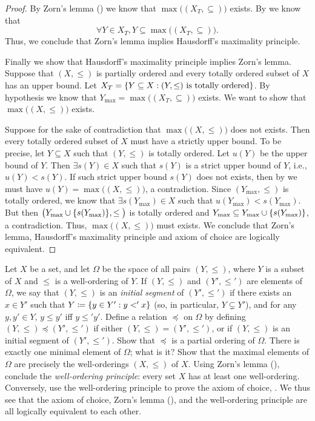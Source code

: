 \begin{proof}
  By Zorn's lemma () we know that \(\max\big((X_T, \subseteq)\big)\) exists.
  By  we know that
  \[
    \forall Y \in X_T, Y \subseteq \max\big((X_T, \subseteq)\big).
  \]
  Thus, we conclude that Zorn's lemma implies Hausdorff's maximality principle.

  Finally we show that Hausdorff's maximality principle implies Zorn's lemma.
  Suppose that \((X, \leq)\) is partially ordered and every totally ordered subset of \(X\) has an upper bound.
  Let \(X_T = \left\lbrace Y \subseteq X : (Y, \leq) \text{ is totally ordered}\right\rbrace\).
  By hypothesis we know that \(Y_{\max} = \max\big((X_T, \subseteq)\big)\) exists.
  We want to show that \(\max\big((X, \leq)\big)\) exists.

  Suppose for the sake of contradiction that \(\max\big((X, \leq)\big)\) does not exists.
  Then every totally ordered subset of \(X\) must have a strictly upper bound.
  To be precise, let \(Y \subseteq X\) such that \((Y, \leq)\) is totally ordered.
  Let \(u(Y)\) be the upper bound of \(Y\).
  Then \(\exists s(Y) \in X\) such that \(s(Y)\) is a strict upper bound of \(Y\), i.e., \(u(Y) < s(Y)\).
  If such strict upper bound \(s(Y)\) does not exists, then by  we must have \(u(Y) = \max\big((X, \leq)\big)\), a contradiction.
  Since \((Y_{\max}, \leq)\) is totally ordered, we know that \(\exists s(Y_{\max}) \in X\) such that \(u(Y_{\max}) < s(Y_{\max})\).
  But then \(\big(Y_{\max} \cup \set{s(Y_{\max})}, \leq\big)\) is totally ordered and \(Y_{\max} \subseteq Y_{\max} \cup \left\lbrace s(Y_{\max})\right\rbrace\), a contradiction.
  Thus, \(\max\big((X, \leq)\big)\) must exists.
  We conclude that Zorn's lemma, Hausdorff's maximality principle and axiom of choice are logically equivalent.
\end{proof}

\begin{ex}\label{i:ex:8.5.19}
  Let \(X\) be a set, and let \(\Omega\) be the space of all pairs \((Y, \leq)\), where \(Y\) is a subset of \(X\) and \(\leq\) is a well-ordering of \(Y\).
  If \((Y, \leq)\) and \((Y', \leq')\) are elements of \(\Omega\), we say that \((Y, \leq)\) is an \emph{initial segment} of \((Y', \leq')\) if there exists an \(x \in Y'\) such that \(Y \coloneqq \left\lbrace y \in Y' : y <' x\right\rbrace\) (so, in particular, \(Y \subsetneq Y'\)), and for any \(y, y' \in Y\), \(y \leq y'\) iff \(y \leq' y'\).
  Define a relation \(\preceq\) on \(\Omega\) by defining \((Y, \leq) \preceq (Y', \leq')\) if either \((Y, \leq) = (Y', \leq')\), or if \((Y, \leq)\) is an initial segment of \((Y', \leq')\).
  Show that \(\preceq\) is a partial ordering of \(\Omega\).
  There is exactly one minimal element of \(\Omega\);
  what is it?
  Show that the maximal elements of \(\Omega\) are precisely the well-orderings \((X, \leq)\) of \(X\).
  Using Zorn's lemma (), conclude the \emph{well-ordering principle}:
  every set \(X\) has at least one well-ordering.
  Conversely, use the well-ordering principle to prove the axiom of choice, .
  We thus see that the axiom of choice, Zorn's lemma (), and the well-ordering principle are all logically equivalent to each other.
\end{ex}

